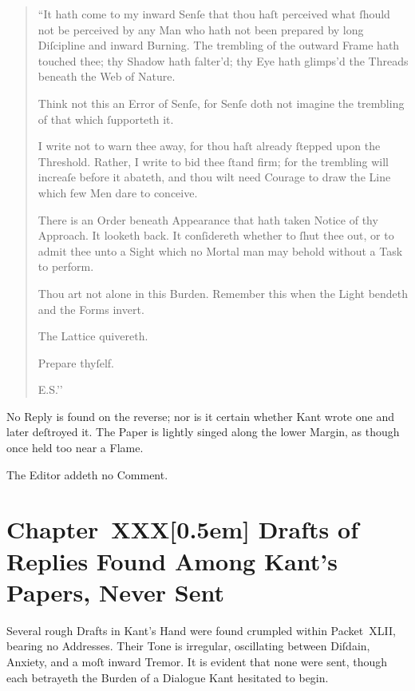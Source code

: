 \documentclass[12pt]{book}
\begin{document}
\begin{quote}
``It hath come to my inward Senſe that thou haſt perceived what ſhould not be perceived by any Man who hath not been prepared by long Diſcipline and inward Burning. The trembling of the outward Frame hath touched thee; thy Shadow hath falter’d; thy Eye hath glimps’d the Threads beneath the Web of Nature.

Think not this an Error of Senſe, for Senſe doth not imagine the trembling of that which ſupporteth it.

I write not to warn thee away, for thou haſt already ſtepped upon the Threshold. Rather, I write to bid thee ſtand firm; for the trembling will increaſe before it abateth, and thou wilt need Courage to draw the Line which few Men dare to conceive.

There is an Order beneath Appearance that hath taken Notice of thy Approach. It looketh back. It conſidereth whether to ſhut thee out, or to admit thee unto a Sight which no Mortal man may behold without a Task to perform.

Thou art not alone in this Burden. Remember this when the Light bendeth and the Forms invert.

The Lattice quivereth.

Prepare thyſelf.

\hfill E.S.’’
\end{quote}

\medskip

No Reply is found on the reverse; nor is it certain whether Kant wrote one and later deſtroyed it. The Paper is lightly singed along the lower Margin, as though once held too near a Flame.

The Editor addeth no Comment.


\chapter*{Chapter~XXX[0.5em]
Drafts of Replies Found Among Kant’s Papers, Never Sent}


Several rough Drafts in Kant's Hand were found crumpled within Packet~XLII, bearing no Addresses. Their Tone is irregular, oscillating between Diſdain, Anxiety, and a moſt inward Tremor. It is evident that none were sent, though each betrayeth the Burden of a Dialogue Kant hesitated to begin.
\end{document}
